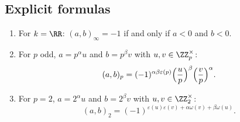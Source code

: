 \subsection{Explicit formulas}\label{p-adic-numbers:subsection-hilbert-formulas}

\begin{theorem}\label{p-adic-numbers:theorem-hilbert-formulas}
\begin{enumerate}
\item For $k = \RR$: $(a, b)_\infty = -1$ if and only if $a < 0$ and $b < 0$.
\item For $p$ odd, $a = p^\alpha u$ and $b = p^\beta v$ with $u, v \in \ZZ_p^\times$:
\[
(a, b)_p = (-1)^{\alpha\beta\varepsilon(p)}\Bigl(\frac up\Bigr)^\beta\Bigl(\frac vp\Bigr)^\alpha .
\]
\item For $p = 2$, $a = 2^\alpha u$ and $b = 2^\beta v$ with $u, v \in \ZZ_2^\times$:
\[
(a, b)_2 = (-1)^{\varepsilon(u)\varepsilon(v) + \alpha\omega(v) + \beta\omega(u)} .
\]
\end{enumerate}
\end{theorem}

